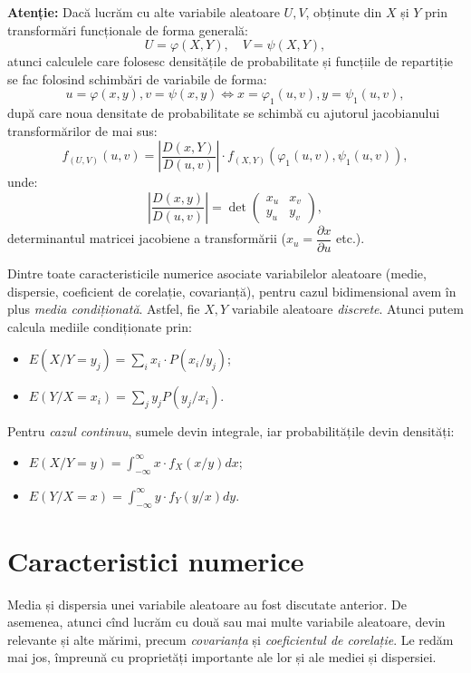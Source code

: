 \textbf{Atenție:} Dacă lucrăm cu alte variabile aleatoare $ U, V $, obținute
din $ X $ și $ Y $ prin transformări funcționale de forma generală:
\[
  U = \varphi(X, Y), \quad V = \psi(X, Y),
\]
atunci calculele care folosesc densitățile de probabilitate și funcțiile
de repartiție se fac folosind schimbări de variabile de forma:
\[
  u = \varphi(x, y), v = \psi(x, y) \Leftrightarrow %
  x = \varphi_1(u, v), y = \psi_1(u,v),
\]
după care noua densitate de probabilitate se schimbă cu ajutorul jacobianului
transformărilor de mai sus:
\[
  f_{(U, V)}(u,v) = \left| \dfrac{D(x, Y)}{D(u,v)} \right| \cdot %
  f_{(X, Y)}(\varphi_1(u,v), \psi_1(u, v)),
\]
unde:
\[
  \left| \dfrac{D(x, y)}{D(u,v)} \right| = \det %
  \begin{pmatrix}
    x_u & x_v \\
    y_u & y_v
  \end{pmatrix},
\]
determinantul matricei jacobiene a transformării ($ x_u = \dfrac{\partial x}{\partial u} $
etc.).

\vspace{0.3cm}

Dintre toate caracteristicile numerice asociate variabilelor aleatoare
(medie, dispersie, coeficient de corelație, covarianță), pentru cazul
bidimensional avem în plus \emph{media condiționată}. Astfel, fie $ X, Y $
variabile aleatoare \emph{discrete}. Atunci putem calcula mediile condiționate
prin:
\begin{itemize}
\item $ E(X / Y = y_j) = \sum_i x_i \cdot P(x_i / y_j) $;
\item $ E(Y / X = x_i) = \sum_j y_j P(y_j / x_i) $.
\end{itemize}

Pentru \emph{cazul continuu}, sumele devin integrale, iar probabilitățile
devin densități:
\begin{itemize}
\item $ E(X / Y = y) = \int_{-\infty}^\infty x \cdot f_X(x/y) dx $;
\item $ E(Y / X = x) = \int_{-\infty}^\infty y \cdot f_Y(y/x) dy $.
\end{itemize}

\section{Caracteristici numerice}

Media și dispersia unei variabile aleatoare au fost discutate anterior.
De asemenea, atunci cînd lucrăm cu două sau mai multe variabile aleatoare,
devin relevante și alte mărimi, precum \emph{covarianța} și
\emph{coeficientul de corelație}. Le redăm mai jos, împreună cu proprietăți
importante ale lor și ale mediei și dispersiei.

